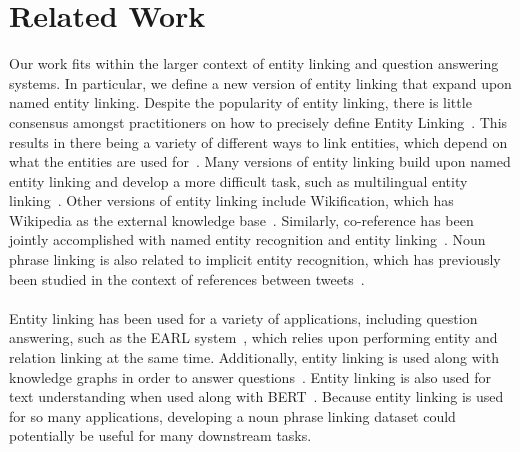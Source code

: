 \section{Related Work}
\label{sec:rel}

Our work fits within the larger context of entity linking and question answering systems. 
In particular, we define a new version of entity linking that expand upon named entity linking. 
Despite the popularity of entity linking, there is little consensus amongst practitioners on how to precisely define Entity Linking~\cite{ling2015design}. 
This results in there being a variety of different ways to link entities, which depend on what the entities are used for~\cite{rosales2018should}.
Many versions of entity linking build upon named entity linking and develop a more difficult task, such as multilingual entity linking~\cite{raiman2018deeptype}. 
Other versions of entity linking include Wikification, which has Wikipedia as the external knowledge base~\cite{cheng2013relational}. 
Similarly, co-reference has been jointly accomplished with named entity recognition and entity linking~\cite{durrett2014joint}. 
Noun phrase linking is also related to implicit entity recognition, which has previously been studied in the context of references between tweets~\cite{hosseini2019implicit}. 
\\
\\
Entity linking has been used for a variety of applications, including question answering, such as the EARL system~\cite{dubey2018earl,dubey2016asknow}, which relies upon performing entity and relation linking at the same time. 
Additionally, entity linking is used along with knowledge graphs in order to answer questions~\cite{zhao2020delft}. 
Entity linking is also used for text understanding when used along with BERT~\cite{broscheit2020investigating}. 
Because entity linking is used for so many applications, developing a noun phrase linking dataset could potentially be useful for many downstream tasks. 

